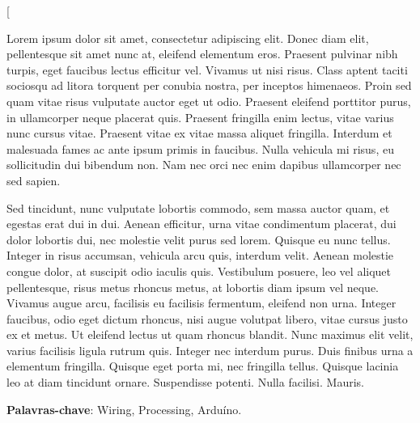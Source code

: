 \documentclass[
	article,			%
	11pt,				%
	oneside,			%
	a4paper,			%
	english,			%
	brazil,				%
	sumario=tradicional
	]{abntex2}
\begin{document}

\frenchspacing 


%
\twocolumn[    		%
%
\maketitle

\begin{resumoumacoluna}
 

Lorem ipsum dolor sit amet, consectetur adipiscing elit. Donec diam elit, pellentesque sit amet nunc at, eleifend elementum eros. Praesent pulvinar nibh turpis, eget faucibus lectus efficitur vel. Vivamus ut nisi risus. Class aptent taciti sociosqu ad litora torquent per conubia nostra, per inceptos himenaeos. Proin sed quam vitae risus vulputate auctor eget ut odio. Praesent eleifend porttitor purus, in ullamcorper neque placerat quis. Praesent fringilla enim lectus, vitae varius nunc cursus vitae. Praesent vitae ex vitae massa aliquet fringilla. Interdum et malesuada fames ac ante ipsum primis in faucibus. Nulla vehicula mi risus, eu sollicitudin dui bibendum non. Nam nec orci nec enim dapibus ullamcorper nec sed sapien.

Sed tincidunt, nunc vulputate lobortis commodo, sem massa auctor quam, et egestas erat dui in dui. Aenean efficitur, urna vitae condimentum placerat, dui dolor lobortis dui, nec molestie velit purus sed lorem. Quisque eu nunc tellus. Integer in risus accumsan, vehicula arcu quis, interdum velit. Aenean molestie congue dolor, at suscipit odio iaculis quis. Vestibulum posuere, leo vel aliquet pellentesque, risus metus rhoncus metus, at lobortis diam ipsum vel neque. Vivamus augue arcu, facilisis eu facilisis fermentum, eleifend non urna. Integer faucibus, odio eget dictum rhoncus, nisi augue volutpat libero, vitae cursus justo ex et metus. Ut eleifend lectus ut quam rhoncus blandit. Nunc maximus elit velit, varius facilisis ligula rutrum quis. Integer nec interdum purus. Duis finibus urna a elementum fringilla. Quisque eget porta mi, nec fringilla tellus. Quisque lacinia leo at diam tincidunt ornare. Suspendisse potenti. Nulla facilisi. Mauris. 
 
 \vspace{\onelineskip}
 
 \noindent
 \textbf{Palavras-chave}: Wiring, Processing, Arduíno.
\end{resumoumacoluna}
\end{document}
